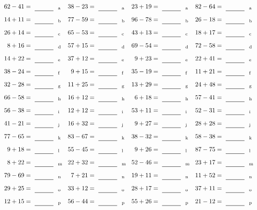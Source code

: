 \documentclass
[
  draft    = true,
  fontsize = 11pt,
  parskip  = half-
]
{scrartcl}
\begin{document}
\clearpage
\begin{align*}
    \pline{62-41}&=\rline{a}
  & \pline{38-23}&=\rline{a}
  & \pline{23+19}&=\rline{a}
  & \pline{82-64}&=\rline{a} \\[1ex]
    \pline{14+11}&=\rline{b}
  & \pline{77-59}&=\rline{b}
  & \pline{96-78}&=\rline{b}
  & \pline{26-18}&=\rline{b} \\[1ex]
    \pline{26+14}&=\rline{c}
  & \pline{65-53}&=\rline{c}
  & \pline{43+13}&=\rline{c}
  & \pline{18+17}&=\rline{c} \\[1ex]
    \pline{8+16}&=\rline{d}
  & \pline{57+15}&=\rline{d}
  & \pline{69-54}&=\rline{d}
  & \pline{72-58}&=\rline{d} \\[1ex]
    \pline{14+22}&=\rline{e}
  & \pline{37+12}&=\rline{e}
  & \pline{9+23}&=\rline{e}
  & \pline{22+41}&=\rline{e} \\[1ex]
    \pline{38-24}&=\rline{f}
  & \pline{9+15}&=\rline{f}
  & \pline{35-19}&=\rline{f}
  & \pline{11+21}&=\rline{f} \\[1ex]
    \pline{32-28}&=\rline{g}
  & \pline{11+25}&=\rline{g}
  & \pline{13+29}&=\rline{g}
  & \pline{24+48}&=\rline{g} \\[1ex]
    \pline{66-58}&=\rline{h}
  & \pline{16+12}&=\rline{h}
  & \pline{6+18}&=\rline{h}
  & \pline{57-41}&=\rline{h} \\[1ex]
    \pline{56-38}&=\rline{i}
  & \pline{12+12}&=\rline{i}
  & \pline{53+11}&=\rline{i}
  & \pline{52-31}&=\rline{i} \\[1ex]
    \pline{41-21}&=\rline{j}
  & \pline{16+32}&=\rline{j}
  & \pline{9+27}&=\rline{j}
  & \pline{28+28}&=\rline{j} \\[1ex]
    \pline{77-65}&=\rline{k}
  & \pline{83-67}&=\rline{k}
  & \pline{38-32}&=\rline{k}
  & \pline{58-38}&=\rline{k} \\[1ex]
    \pline{9+18}&=\rline{l}
  & \pline{55-45}&=\rline{l}
  & \pline{9+26}&=\rline{l}
  & \pline{87-75}&=\rline{l} \\[1ex]
    \pline{8+22}&=\rline{m}
  & \pline{22+32}&=\rline{m}
  & \pline{52-46}&=\rline{m}
  & \pline{23+17}&=\rline{m} \\[1ex]
    \pline{79-69}&=\rline{n}
  & \pline{7+21}&=\rline{n}
  & \pline{19+11}&=\rline{n}
  & \pline{11+52}&=\rline{n} \\[1ex]
    \pline{29+25}&=\rline{o}
  & \pline{33+12}&=\rline{o}
  & \pline{28+17}&=\rline{o}
  & \pline{37+11}&=\rline{o} \\[1ex]
    \pline{12+15}&=\rline{p}
  & \pline{56-44}&=\rline{p}
  & \pline{55+26}&=\rline{p}
  & \pline{21-12}&=\rline{p}
\end{align*}
\end{document}

